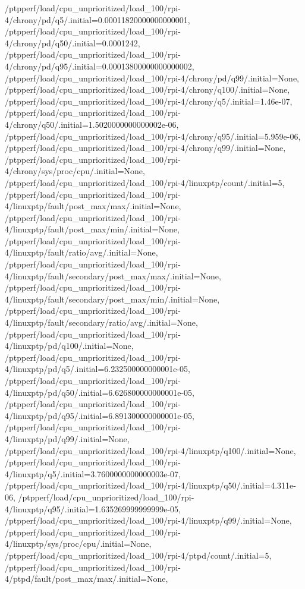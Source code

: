 {    /ptpperf/load/cpu_unprioritized/load_100/rpi-4/chrony/pd/q5/.initial=0.00011820000000000001,
    /ptpperf/load/cpu_unprioritized/load_100/rpi-4/chrony/pd/q50/.initial=0.0001242,
    /ptpperf/load/cpu_unprioritized/load_100/rpi-4/chrony/pd/q95/.initial=0.00013800000000000002,
    /ptpperf/load/cpu_unprioritized/load_100/rpi-4/chrony/pd/q99/.initial=None,
    /ptpperf/load/cpu_unprioritized/load_100/rpi-4/chrony/q100/.initial=None,
    /ptpperf/load/cpu_unprioritized/load_100/rpi-4/chrony/q5/.initial=1.46e-07,
    /ptpperf/load/cpu_unprioritized/load_100/rpi-4/chrony/q50/.initial=1.5020000000000002e-06,
    /ptpperf/load/cpu_unprioritized/load_100/rpi-4/chrony/q95/.initial=5.959e-06,
    /ptpperf/load/cpu_unprioritized/load_100/rpi-4/chrony/q99/.initial=None,
    /ptpperf/load/cpu_unprioritized/load_100/rpi-4/chrony/sys/proc/cpu/.initial=None,
    /ptpperf/load/cpu_unprioritized/load_100/rpi-4/linuxptp/count/.initial=5,
    /ptpperf/load/cpu_unprioritized/load_100/rpi-4/linuxptp/fault/post_max/max/.initial=None,
    /ptpperf/load/cpu_unprioritized/load_100/rpi-4/linuxptp/fault/post_max/min/.initial=None,
    /ptpperf/load/cpu_unprioritized/load_100/rpi-4/linuxptp/fault/ratio/avg/.initial=None,
    /ptpperf/load/cpu_unprioritized/load_100/rpi-4/linuxptp/fault/secondary/post_max/max/.initial=None,
    /ptpperf/load/cpu_unprioritized/load_100/rpi-4/linuxptp/fault/secondary/post_max/min/.initial=None,
    /ptpperf/load/cpu_unprioritized/load_100/rpi-4/linuxptp/fault/secondary/ratio/avg/.initial=None,
    /ptpperf/load/cpu_unprioritized/load_100/rpi-4/linuxptp/pd/q100/.initial=None,
    /ptpperf/load/cpu_unprioritized/load_100/rpi-4/linuxptp/pd/q5/.initial=6.232500000000001e-05,
    /ptpperf/load/cpu_unprioritized/load_100/rpi-4/linuxptp/pd/q50/.initial=6.626800000000001e-05,
    /ptpperf/load/cpu_unprioritized/load_100/rpi-4/linuxptp/pd/q95/.initial=6.891300000000001e-05,
    /ptpperf/load/cpu_unprioritized/load_100/rpi-4/linuxptp/pd/q99/.initial=None,
    /ptpperf/load/cpu_unprioritized/load_100/rpi-4/linuxptp/q100/.initial=None,
    /ptpperf/load/cpu_unprioritized/load_100/rpi-4/linuxptp/q5/.initial=3.7600000000000003e-07,
    /ptpperf/load/cpu_unprioritized/load_100/rpi-4/linuxptp/q50/.initial=4.311e-06,
    /ptpperf/load/cpu_unprioritized/load_100/rpi-4/linuxptp/q95/.initial=1.635269999999999e-05,
    /ptpperf/load/cpu_unprioritized/load_100/rpi-4/linuxptp/q99/.initial=None,
    /ptpperf/load/cpu_unprioritized/load_100/rpi-4/linuxptp/sys/proc/cpu/.initial=None,
    /ptpperf/load/cpu_unprioritized/load_100/rpi-4/ptpd/count/.initial=5,
    /ptpperf/load/cpu_unprioritized/load_100/rpi-4/ptpd/fault/post_max/max/.initial=None,
}
